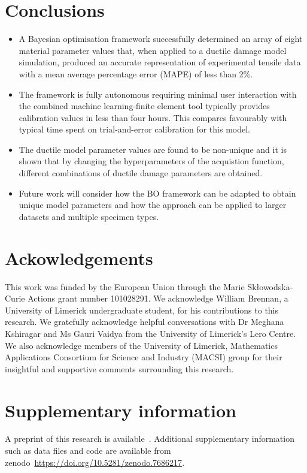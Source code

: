 \documentclass[preprint, review, 12pt]{elsarticle}
\begin{document}
	\section{Conclusions}
	\label{h:conclusions}

	\begin{itemize}
		\item A Bayesian optimisation framework successfully determined an array of eight material parameter values that, when applied to a ductile damage model simulation, produced an accurate representation of experimental tensile data with a mean average percentage error (MAPE) of less than 2\%.
		\item The framework is fully autonomous requiring minimal user interaction with the combined machine learning-finite element tool typically provides calibration values in less than four hours.
		This compares favourably with typical time spent on trial-and-error calibration for this model.
		\item The ductile model parameter values are found to be non-unique and it is shown that by changing the hyperparameters of the acquistion function, different combinations of ductile damage parameters are obtained.
		\item Future work will consider how the BO framework can be adapted to obtain unique model parameters and how the approach can be applied to larger datasets and multiple specimen types.
	\end{itemize}

	\section{Ackowledgements}
	\label{h:acknowledgements}

	This work was funded by the European Union through the Marie Sk{\l}owodska-Curie Actions grant number 101028291.
	We acknowledge William Brennan, a University of Limerick undergraduate student, for his contributions to this research.
	We gratefully acknowledge helpful conversations with Dr Meghana Kshiragar and Ms Gauri Vaidya from the University of Limerick's Lero Centre.
	We also acknowledge members of the University of Limerick, Mathematics Applications Consortium for Science and Industry (MACSI) group for their insightful and supportive comments surrounding this research.

	\section{Supplementary information}
	\label{h:supplementary}

	A preprint of this research is available~\cite{OCONNOR2023}.
	Additional supplementary information such as data files and code are available from zenodo~\url{https://doi.org/10.5281/zenodo.7686217}.


%


\end{document}
